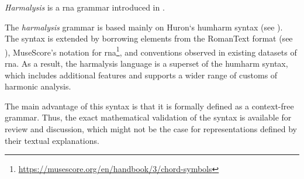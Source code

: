 

\emph{Harmalysis} is a \gls{rna} grammar introduced in
\textcite{napoleslopez2020harmalysis}.

The \emph{harmalysis} grammar is based mainly on Huron‘s
\gls{humharm} syntax (see ).
The syntax is extended by borrowing elements from the
RomanText format (see ), MuseScore's
notation for
\gls{rna}\footnote{\href{https://musescore.org/en/handbook/3/chord-symbols\#rna}{https://musescore.org/en/handbook/3/chord-symbols}},
and conventions observed in existing datasets of \gls{rna}.
As  a result,  the harmalysis language is a superset  of the
\gls{humharm} syntax,  which includes additional features
and supports a wider range of customs of harmonic analysis.

The main advantage of this syntax is that it is formally
defined as a context-free grammar. Thus, the exact
mathematical validation of the syntax is available for
review and discussion, which might not be the case for
representations defined by their textual explanations.
